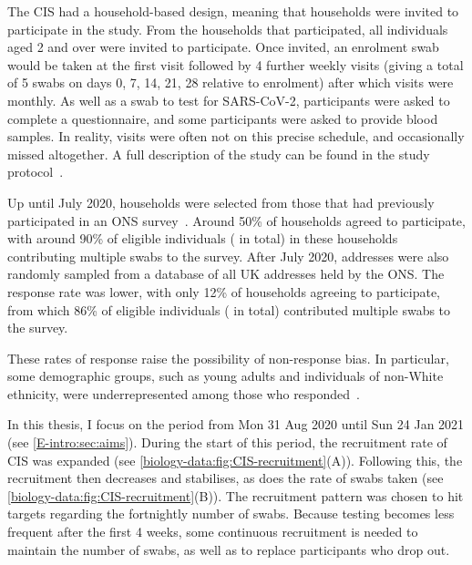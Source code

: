 \documentclass[thesis.tex]{subfiles}
\begin{document}
The CIS had a household-based design, meaning that households were invited to participate in the study.
From the households that participated, all individuals aged 2 and over were invited to participate.
Once invited, an enrolment swab would be taken at the first visit followed by 4 further weekly visits (giving a total of 5 swabs on days 0, 7, 14, 21, 28 relative to enrolment) after which visits were monthly.
As well as a swab to test for SARS-CoV-2, participants were asked to complete a questionnaire, and some participants were asked to provide blood samples.
In reality, visits were often not on this precise schedule, and occasionally missed altogether.
A full description of the study can be found in the study protocol~\autocite{cisProtocol}.

Up until July 2020, households were selected from those that had previously participated in an ONS survey~\autocite{CIStechData}.
Around 50\% of households agreed to participate, with around 90\% of eligible individuals ( in total) in these households contributing multiple swabs to the survey.
After July 2020, addresses were also randomly sampled from a database of all UK addresses held by the ONS.
The response rate was lower, with only 12\% of households agreeing to participate, from which 86\% of eligible individuals ( in total) contributed multiple swabs to the survey.

These rates of response raise the possibility of non-response bias.
In particular, some demographic groups, such as young adults and individuals of non-White ethnicity, were underrepresented among those who responded~\autocite{pouwelsCommunity}.

In this thesis, I focus on the period from Mon 31 Aug 2020 until Sun 24 Jan 2021 (see \cref{E-intro:sec:aims}).
During the start of this period, the recruitment rate of CIS was expanded (see \cref{biology-data:fig:CIS-recruitment}(A)).
Following this, the recruitment then decreases and stabilises, as does the rate of swabs taken (see \cref{biology-data:fig:CIS-recruitment}(B)).
The recruitment pattern was chosen to hit targets regarding the fortnightly number of swabs.
Because testing becomes less frequent after the first 4 weeks, some continuous recruitment is needed to maintain the number of swabs, as well as to replace participants who drop out.
\end{document}
